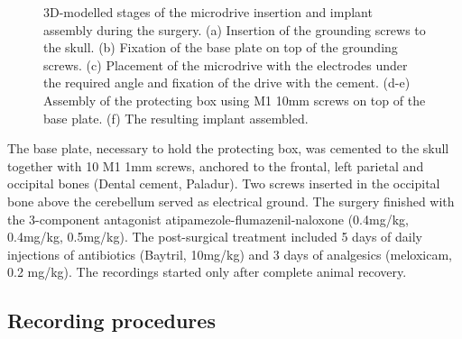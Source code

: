 \begin{figure}
\captionsetup{format=plain}
\caption[Surgical procedures]{
3D-modelled stages of the microdrive insertion and implant assembly during the surgery. (a) Insertion of the grounding screws to the skull. (b) Fixation of the base plate on top of the grounding screws. (c) Placement of the microdrive with the electrodes under the required angle and fixation of the drive with the cement. (d-e) Assembly of the protecting box using M1 10mm screws on top of the base plate. (f) The resulting implant assembled.
}
\label{fig:F31_surgery}
\end{figure}

The base plate, necessary to hold the protecting box, was cemented to the skull together with 10 M1 1mm screws, anchored to the frontal, left parietal and occipital bones (Dental cement, Paladur). Two screws inserted in the occipital bone above the cerebellum served as electrical ground. The surgery finished with the 3-component antagonist atipamezole-flumazenil-naloxone (0.4mg/kg, 0.4mg/kg, 0.5mg/kg). The post-surgical treatment included 5 days of daily injections of antibiotics (Baytril, 10mg/kg) and 3 days of analgesics (meloxicam, 0.2 mg/kg). The recordings started only after complete animal recovery.


\subsection{Recording procedures}

